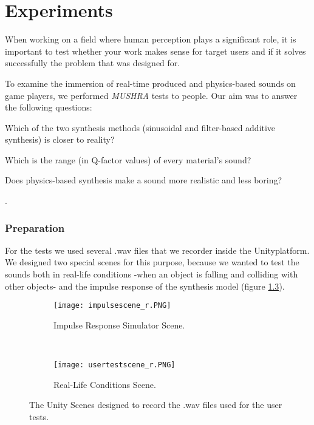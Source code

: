 \chapter{Experiments}\label{ch:tests}
\done{}

When working on a field where human perception plays a significant role, it is important to test whether your work makes sense for target users and if it solves successfully the problem that was designed for.

To examine the immersion of real-time produced and physics-based sounds on game players, we performed \textit{MUSHRA}\cite{series2014method} tests to people. Our aim was to answer the following questions: \begin{inparaenum}[1)]
\item Which of the two synthesis methods (sinusoidal and filter-based additive synthesis) is closer to reality? 
\item Which is the range (in Q-factor values) of every material's sound?
\item Does physics-based synthesis make a sound more realistic and less boring?
\end{inparaenum}.

\subsection{Preparation}
For the tests we used several .wav files that we recorder inside the Unity\textregistered platform. We designed two special scenes for this purpose, because we wanted to test the sounds both in real-life conditions -when an object is falling and colliding with other objects- and the impulse response of the synthesis model (figure \ref{fig:test_scenes}). 

\begin{figure}[H]
    \centering
    \begin{subfigure}[b]{0.45\textwidth}
        \texttt{[image: impulsescene\_r.PNG]}
        \caption{Impulse Response Simulator Scene.}
        \label{fig:test_sc1}
    \end{subfigure}
    ~ %
    \begin{subfigure}[b]{0.45\textwidth}
        \texttt{[image: usertestscene\_r.PNG]}
        \caption{Real-Life Conditions Scene.}
        \label{fig:test_sc2}
    \end{subfigure}
    \caption{The Unity Scenes designed to record the .wav files used for the user tests.}\label{fig:test_scenes}
\end{figure}

